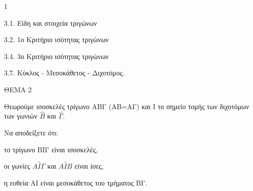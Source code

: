 \begin{ylh}{1}
    \item 3.1. Είδη και στοιχεία τριγώνων
    \item 3.2. 1ο Κριτήριο ισότητας τριγώνων
    \item 3.4. 3ο Κριτήριο ισότητας τριγώνων
    \item 3.7. Κύκλος - Μεσοκάθετος - Διχοτόμος.
\end{ylh}

ΘΕΜΑ 2

Θεωρούμε ισοσκελές τρίγωνο ΑΒΓ (ΑΒ=ΑΓ) και Ι το σημείο τομής των διχοτόμων των γωνιών $\widehat{Β}$ και $\widehat{\Gamma}$.

Να αποδείξετε ότι:

\begin{alist}
\item το τρίγωνο ΒΙΓ είναι ισοσκελές, 

\item οι γωνίες $Α\widehat{Ι}\Gamma$ και $Α\widehat{Ι}Β$ είναι ίσες, 

\item η ευθεία ΑΙ είναι μεσοκάθετος του τμήματος ΒΓ. 
\end{alist}
